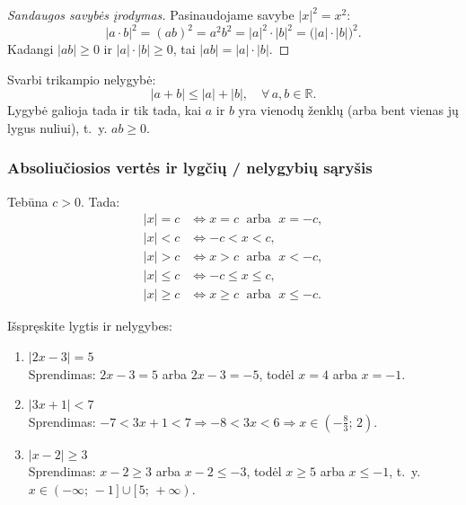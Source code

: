 \begin{proof}[Sandaugos savybės įrodymas]
Pasinaudojame savybe $|x|^2 = x^2$:
\[
|a \cdot b|^2 = (ab)^2 = a^2 b^2 = |a|^2 \cdot |b|^2 = \bigl(|a| \cdot |b|\bigr)^2.
\]
Kadangi $|ab| \geq 0$ ir $|a|\cdot|b| \geq 0$, tai $|ab| = |a| \cdot |b|$.
\end{proof}

\begin{tcolorbox}[title={Trikampio nelygybė}, colback=blue!5!white, colframe=blue!60!black]
Svarbi trikampio nelygybė:
\[
|a + b| \leq |a| + |b|, \quad \forall\, a, b \in \mathbb{R}.
\]
Lygybė galioja tada ir tik tada, kai $a$ ir $b$ yra vienodų ženklų (arba bent vienas jų lygus nuliui), t.~y. $ab \geq 0$.
\end{tcolorbox}

\subsubsection*{Absoliučiosios vertės ir lygčių / nelygybių sąryšis}

\begin{theorem}
Tebūna $c > 0$. Tada:
\begin{align*}
|x| = c &\iff x = c \;\text{ arba }\; x = -c, \\
|x| < c &\iff -c < x < c, \\
|x| > c &\iff x > c \;\text{ arba }\; x < -c, \\
|x| \leq c &\iff -c \leq x \leq c, \\
|x| \geq c &\iff x \geq c \;\text{ arba }\; x \leq -c.
\end{align*}
\end{theorem}

\begin{example}
Išspręskite lygtis ir nelygybes:
\begin{enumerate}[label=\alph*)]
    \item $|2x - 3| = 5$\\
    Sprendimas: $2x - 3 = 5$ arba $2x - 3 = -5$, todėl $x = 4$ arba $x = -1$.

    \item $|3x + 1| < 7$\\
    Sprendimas: $-7 < 3x + 1 < 7 \Rightarrow -8 < 3x < 6 \Rightarrow x \in \left(-\tfrac{8}{3};\, 2\right)$.

    \item $|x - 2| \geq 3$\\
    Sprendimas: $x - 2 \geq 3$ arba $x - 2 \leq -3$, todėl $x \geq 5$ arba $x \leq -1$, t.~y. $x \in (-\infty;\,-1\,] \cup [\,5;\,+\infty)$.
\end{enumerate}
\end{example}


